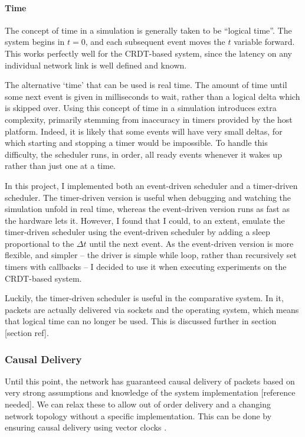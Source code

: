 \documentclass[12pt,a4paper,twoside,openright]{report}
\begin{document}
		\paragraph{Time}
		The concept of time in a simulation is generally taken to be ``logical time''. The system begins in $t = 0$, and each subsequent event moves the $t$ variable forward. This works perfectly well for the CRDT-based system, since the latency on any individual network link is well defined and known.
		
		The alternative `time' that can be used is real time. The amount of time until some next event is given in milliseconds to wait, rather than a logical delta which is skipped over. Using this concept of time in a simulation introduces extra complexity, primarily stemming from inaccuracy in timers provided by the host platform. Indeed, it is likely that some events will have very small deltas, for which starting and stopping a timer would be impossible. To handle this difficulty, the scheduler runs, in order, all ready events whenever it wakes up rather than just one at a time.
		
		In this project, I implemented both an event-driven scheduler and a timer-driven scheduler. The timer-driven version is useful when debugging and watching the simulation unfold in real time, whereas the event-driven version runs as fast as the hardware lets it. However, I found that I could, to an extent, emulate the timer-driven scheduler using the event-driven scheduler by adding a sleep proportional to the $\Delta t$ until the next event. As the event-driven version is more flexible, and simpler -- the driver is simple while loop, rather than recursively set timers with callbacks -- I decided to use it when executing experiments on the CRDT-based system.
		
		Luckily, the timer-driven scheduler is useful in the comparative system. In it, packets are actually delivered via sockets and the operating system, which means that logical time can no longer be used. This is discussed further in section [section ref].
		
		
		\subsubsection{Causal Delivery}
		Until this point, the network has guaranteed causal delivery of packets based on very strong assumptions and knowledge of the system implementation [reference needed]. We can relax these to allow out of order delivery and a changing network topology without a specific implementation. This can be done by ensuring causal delivery using vector clocks \cite{fidge1987}.
		
\end{document}

